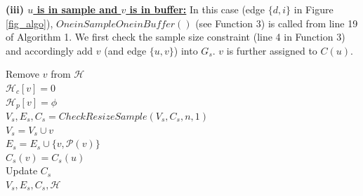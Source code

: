 





\noindent\textbf{(iii) \underline{$u$ is in sample and $v$ is in buffer:}} In this case (edge $\{d,i\}$ in Figure \ref{fig_algo}), $OneinSampleOneinBuffer()$ (see Function 3) is called from line 19 of Algorithm 1. We first check the sample size constraint (line 4 in Function 3) and accordingly add $v$ (and edge $\{u,v\}$) into $G_s$. $v$ is further assigned to $C(u)$.

\begin{function3}[!h]
\caption{\small$OneinSampleOneinBuffer(u,v,e_t,V_s,E_s,\mathcal{H},C_s)$}
Remove $v$ from $\mathcal{H}$\\
$\mathcal{H}_c[v]=0$\\
$\mathcal{H}_p[v]=\phi$\\
$V_s,E_s,C_s = CheckResizeSample(V_s,C_s,n,1)$ \\
$V_s=V_s\cup v$\\
$E_s=E_s \cup \{ v,\mathcal{P}(v)\}$\\
$C_s(v)=C_s(u)$\\
Update $C_s$ \\
\Return $V_s,E_s,C_s,\mathcal{H}$   
\end{function3}

